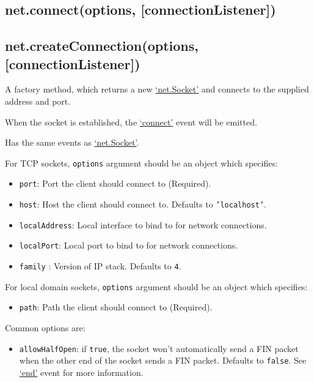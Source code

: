 \subsection{net.connect(options,
{[}connectionListener{]})}\label{net.connectoptions-connectionlistener}

\subsection{net.createConnection(options,
{[}connectionListener{]})}\label{net.createconnectionoptions-connectionlistener}

A factory method, which returns a new
\hyperref[netux5fclassux5fnetux5fsocket]{`net.Socket'} and connects to
the supplied address and port.

When the socket is established, the
\hyperref[netux5feventux5fconnect]{`connect'} event will be emitted.

Has the same events as
\hyperref[netux5fclassux5fnetux5fsocket]{`net.Socket'}.

For TCP sockets, \texttt{options} argument should be an object which
specifies:

\begin{itemize}
\item
  \texttt{port}: Port the client should connect to (Required).
\item
  \texttt{host}: Host the client should connect to. Defaults to
  \texttt{'localhost'}.
\item
  \texttt{localAddress}: Local interface to bind to for network
  connections.
\item
  \texttt{localPort}: Local port to bind to for network connections.
\item
  \texttt{family} : Version of IP stack. Defaults to \texttt{4}.
\end{itemize}

For local domain sockets, \texttt{options} argument should be an object
which specifies:

\begin{itemize}
\itemsep1pt\parskip0pt
\item
  \texttt{path}: Path the client should connect to (Required).
\end{itemize}

Common options are:

\begin{itemize}
\itemsep1pt\parskip0pt
\item
  \texttt{allowHalfOpen}: if \texttt{true}, the socket won't
  automatically send a FIN packet when the other end of the socket sends
  a FIN packet. Defaults to \texttt{false}. See
  \hyperref[netux5feventux5fend]{`end'} event for more information.
\end{itemize}

